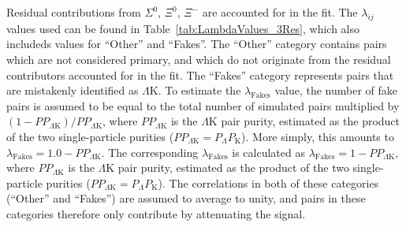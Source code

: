 \documentclass[ALICE,manyauthors]{cernphprep}
\newcommand{\LamK}{$\Lambda$K\xspace}
\begin{document}
Residual contributions from $\Sigma^{0}$, $\Xi^{0}$, $\Xi^{-}$ are accounted for in the fit.
The $\lambda_{ij}$ values used can be found in Table~\ref{tab:LambdaValues_3Res}, which also include{\color{red}d}{\color{blue}s} values for ``Other'' and ``Fakes''.  
The ``Other'' category contains pairs which are not considered primary, and which do not originate from the residual contributors accounted for in the fit.  
The ``Fakes'' category represents pairs that are mistakenly identified as \LamK.
{\color{red}To estimate the $\lambda_{\mathrm{Fakes}}$ value, the number of fake pairs is assumed to be equal to the total number of simulated pairs multiplied by $(1-PP_{\Lambda\mathrm{K}})/PP_{\Lambda\mathrm{K}}$, where $PP_{\Lambda\mathrm{K}}$ is the \LamK pair purity, estimated as the product of the two single-particle purities ($PP_{\Lambda\mathrm{K}} = P_{\Lambda}P_{\mathrm{K}}$).
More simply, this amounts to $\lambda_{\mathrm{Fakes}} = 1.0-PP_{\Lambda\mathrm{K}}$.}
{\color{blue}The corresponding $\lambda_{\mathrm{Fakes}}$ is calculated as $\lambda_{\mathrm{Fakes}} = 1-PP_{\Lambda\mathrm{K}}$, where $PP_{\Lambda\mathrm{K}}$ is the \LamK pair purity, estimated as the product of the two single-particle purities ($PP_{\Lambda\mathrm{K}} = P_{\Lambda}P_{\mathrm{K}}$).}
The correlations in both of these categories (``Other'' and ``Fakes'') are assumed to average to unity, and pairs in these categories therefore only contribute by attenuating the signal. 
\end{document}
